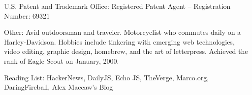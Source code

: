 \documentclass[10pt,letterpaper]{article}
\newenvironment{indentsection}[1]%
{\begin{list}{}%
	{\setlength{\leftmargin}{#1}}%
	\item[]%
}
{\end{list}}
\begin{document}
\begin{indentsection}{\parindent}
\begin{description*}
	\item[U.S. Patent and Trademark Office:]
	Registered Patent Agent -- Registration Number: 69321
	\item[Other:]
	Avid outdoorsman and traveler. Motorcyclist who commutes daily on a Harley-Davidson. Hobbies include tinkering with emerging web technologies, video editing, graphic design, homebrew, and the art of letterpress. Achieved the rank of Eagle Scout on January, 2000.
	\item[Reading List:]
	HackerNews, DailyJS, Echo JS, TheVerge, Marco.org, DaringFireball, Alex Maccaw's Blog
\end{description*}
\end{indentsection}
\end{document}
